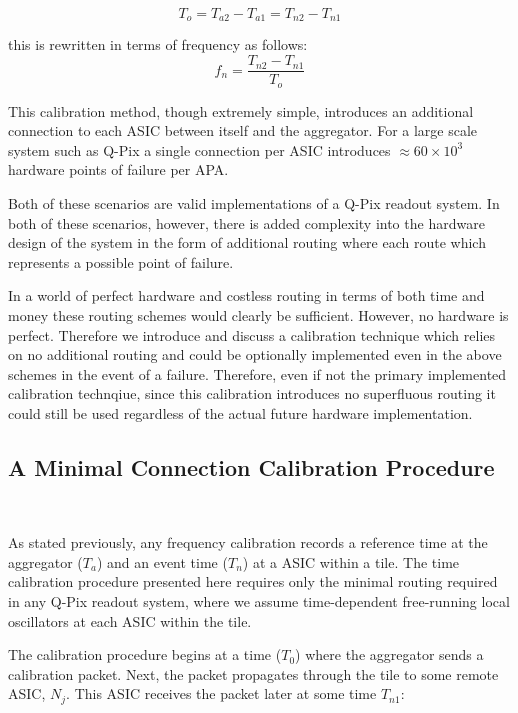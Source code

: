 \begin{equation}
  T_{o} = T_{a2} - T_{a1} = T_{n2} - T_{n1}
\end{equation}

this is rewritten in terms of frequency as follows:
\begin{equation}
  f_{n} = \frac{T_{n2} - T_{n1}}{T_{o}}
\end{equation}

This calibration method, though extremely simple, introduces an additional connection to each ASIC between itself and the aggregator.
For a large scale system such as Q-Pix a single connection per ASIC introduces $\approx 60\times 10^{3}$ hardware points of failure per APA.

Both of these scenarios are valid implementations of a Q-Pix readout system.
In both of these scenarios, however, there is added complexity into the hardware design of the system in the form of additional routing where each route which represents a possible point of failure.

In a world of perfect hardware and costless routing in terms of both time and money these routing schemes would clearly be sufficient.
However, no hardware is perfect.
Therefore we introduce and discuss a calibration technique which relies on no additional routing and could be optionally implemented even in the above schemes in the event of a failure.
Therefore, even if not the primary implemented calibration technqiue, since this calibration introduces no superfluous routing it could still be used regardless of the actual future hardware implementation.

\subsection{A Minimal Connection Calibration Procedure}~\label{sec:min_calib}

As stated previously, any frequency calibration records a reference time at the aggregator ($T_{a}$) and an event time ($T_{n}$) at a ASIC within a tile.
The time calibration procedure presented here requires only the minimal routing required in any Q-Pix readout system, where we assume time-dependent free-running local oscillators at each ASIC within the tile.

The calibration procedure begins at a time ($T_{0}$) where the aggregator sends a calibration packet.
Next, the packet propagates through the tile to some remote ASIC, $N_{j}$.
This ASIC receives the packet later at some time $T_{n1}$:

